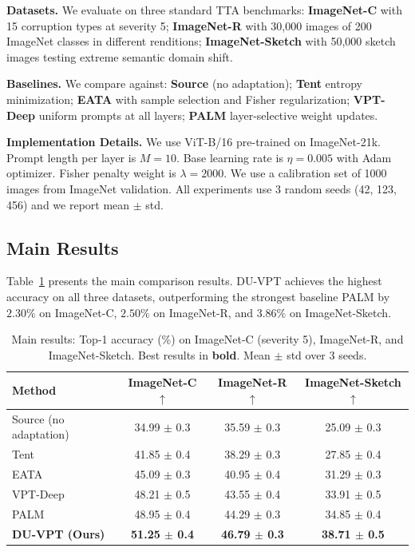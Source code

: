 \documentclass[11pt,a4paper]{article}
\begin{document}
\textbf{Datasets.} We evaluate on three standard TTA benchmarks: \textbf{ImageNet-C} \citep{hendrycks2019benchmarking} with 15 corruption types at severity 5; \textbf{ImageNet-R} \citep{hendrycks2021many} with 30,000 images of 200 ImageNet classes in different renditions; \textbf{ImageNet-Sketch} \citep{wang2019learning} with 50,000 sketch images testing extreme semantic domain shift.

\textbf{Baselines.} We compare against: \textbf{Source} (no adaptation); \textbf{Tent} \citep{wang2021tent} entropy minimization; \textbf{EATA} \citep{niu2022eata} with sample selection and Fisher regularization; \textbf{VPT-Deep} \citep{jia2022visual} uniform prompts at all layers; \textbf{PALM} \citep{maharana2025palm} layer-selective weight updates.

\textbf{Implementation Details.} We use ViT-B/16 pre-trained on ImageNet-21k. Prompt length per layer is $M=10$. Base learning rate is $\eta=0.005$ with Adam optimizer. Fisher penalty weight is $\lambda=2000$. We use a calibration set of 1000 images from ImageNet validation. All experiments use 3 random seeds (42, 123, 456) and we report mean $\pm$ std.

\subsection{Main Results}

Table~\ref{tab:main_results} presents the main comparison results. DU-VPT achieves the highest accuracy on all three datasets, outperforming the strongest baseline PALM by $2.30\%$ on ImageNet-C, $2.50\%$ on ImageNet-R, and $3.86\%$ on ImageNet-Sketch.

\begin{table}[t]
\caption{Main results: Top-1 accuracy (\%) on ImageNet-C (severity 5), ImageNet-R, and ImageNet-Sketch. Best results in \textbf{bold}. Mean $\pm$ std over 3 seeds.}
\label{tab:main_results}
\centering
\begin{tabular}{lccc}
\toprule
Method & ImageNet-C $\uparrow$ & ImageNet-R $\uparrow$ & ImageNet-Sketch $\uparrow$ \\
\midrule
Source (no adaptation) & 34.99 $\pm$ 0.3 & 35.59 $\pm$ 0.3 & 25.09 $\pm$ 0.3 \\
Tent \citep{wang2021tent} & 41.85 $\pm$ 0.4 & 38.29 $\pm$ 0.3 & 27.85 $\pm$ 0.4 \\
EATA \citep{niu2022eata} & 45.09 $\pm$ 0.3 & 40.95 $\pm$ 0.4 & 31.29 $\pm$ 0.3 \\
VPT-Deep \citep{jia2022visual} & 48.21 $\pm$ 0.5 & 43.55 $\pm$ 0.4 & 33.91 $\pm$ 0.5 \\
PALM \citep{maharana2025palm} & 48.95 $\pm$ 0.4 & 44.29 $\pm$ 0.3 & 34.85 $\pm$ 0.4 \\
\textbf{DU-VPT (Ours)} & \textbf{51.25 $\pm$ 0.4} & \textbf{46.79 $\pm$ 0.3} & \textbf{38.71 $\pm$ 0.5} \\
\bottomrule
\end{tabular}
\end{table}
\end{document}
